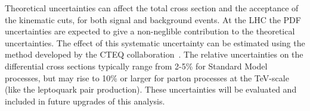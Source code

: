 \begin{enumerate}
Theoretical uncertainties can affect the total cross section and the acceptance of the kinematic cuts, for both signal 
and background events. 
At the LHC the PDF uncertainties are expected to give a non-neglible
contribution to the theoretical uncertainties.  
The effect of this systematic uncertainty can be estimated 
using the method developed by the CTEQ collaboration~\cite{PDFRescaling,CTEQreweighting}.
The relative uncertainties on the differential cross sections 
typically range from 2-5\% for Standard Model processes, 
but may rise to 10\% or larger for parton processes at the TeV-scale 
(like the leptoquark pair production).
These uncertainties will be evaluated and included in future upgrades of this analysis.
%
\end{enumerate}
%
%
